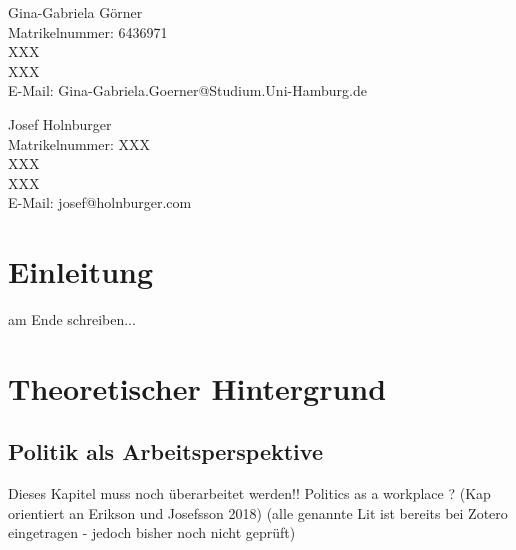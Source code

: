 \documentclass[12pt, 
    twoside=false, 
    bibliography=totoc, 
    numbers=endperiod, 
    headings=normal, 
    toc=chapterentrydotfill
    ]{scrbook}
\begin{document}
\begin{titlepage}
	\begin{minipage}[t]{0.48\textwidth}
    \flushleft 
    Gina-Gabriela Görner \\
    Matrikelnummer: 6436971 \\
    XXX \vspace{0.1cm} \\ 
	XXX \vspace{0.1cm}  \\
	E-Mail: Gina-Gabriela.Goerner@Studium.Uni-Hamburg.de \\ 
    \end{minipage}
    \begin{minipage}[t]{0.48\textwidth}
	\flushleft
	Josef Holnburger \\
	Matrikelnummer: XXX \\
	XXX \vspace{0.1cm} \\
	XXX \vspace{0.1cm} \\
	E-Mail: josef@holnburger.com \\
    \end{minipage}

\end{titlepage}

\frontmatter

\tableofcontents

\listoffigures
{}
\vspace*{24pt}
{\let\clearpage\relax \listoftables}	

\mainmatter



\chapter{Einleitung}\label{Einleitung} 

am Ende schreiben... 

\chapter{Theoretischer Hintergrund}

\section{Politik als Arbeitsperspektive} 
Dieses Kapitel muss noch überarbeitet werden!! 
Politics as a workplace ? (Kap orientiert an Erikson und Josefsson 2018) (alle genannte Lit ist bereits bei Zotero eingetragen - jedoch bisher noch nicht geprüft)  
\end{document}
